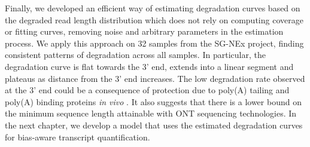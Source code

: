 Finally, we developed an efficient way of estimating degradation curves based on the degraded read length distribution which does not rely on computing coverage or fitting curves, removing noise and arbitrary parameters in the estimation process. We apply this approach on 32 samples from the SG-NEx project, finding consistent patterns of degradation across all samples. In particular, the degradation curve is flat towards the 3' end, extends into a linear segment and plateaus as distance from the 3' end increases. The low degradation rate observed at the 3' end could be a consequence of protection due to poly(A) tailing and poly(A) binding proteins \textit{in vivo} \cite{Wang2000}. It also suggests that there is a lower bound on the minimum sequence length attainable with ONT sequencing technologies. In the next chapter, we develop a model that uses the estimated degradation curves for bias-aware transcript quantification. 
